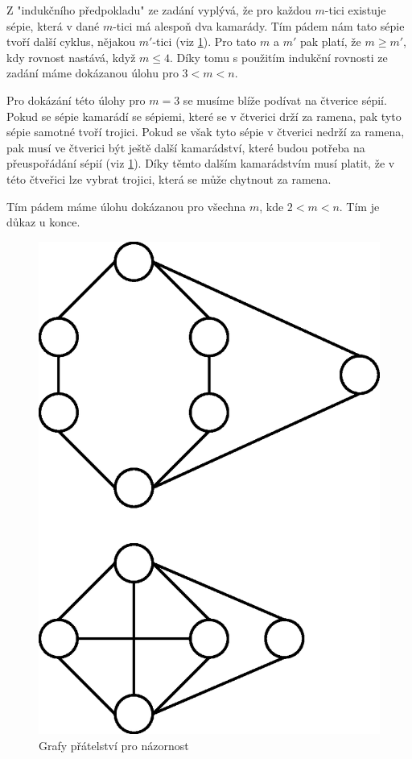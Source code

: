 \documentclass{fkssolpub}
\author{Ondřej Sedláček}
\begin{document}
Z "indukčního předpokladu" ze zadání vyplývá, že pro každou $m$-tici existuje
sépie, která v dané $m$-tici má alespoň dva kamarády. Tím pádem nám tato sépie
tvoří další cyklus, nějakou $m'$-tici (viz \ref{fig:graphs}). Pro tato $m$ a $m'$ pak platí, že
$m \geq m'$, kdy rovnost nastává, když $m \leq 4$. Díky tomu s použitím
indukční rovnosti ze zadání máme dokázanou úlohu pro $3 < m < n$.

Pro dokázání této úlohy pro $m = 3$ se musíme blíže podívat na čtverice sépií.
Pokud se sépie kamarádí se sépiemi, které se v čtverici drží za ramena, pak
tyto sépie samotné tvoří trojici. Pokud se však tyto sépie v čtverici nedrží
za ramena, pak musí ve čtverici být ještě další kamarádství, které budou
potřeba na přeuspořádání sépií (viz \ref{fig:graphs}). Díky těmto dalším
kamarádstvím musí platit, že v této čtveřici lze vybrat trojici, která
se může chytnout za ramena.

Tím pádem máme úlohu dokázanou pro všechna $m$, kde $2 < m < n$. Tím je
důkaz u konce.

\begin{figure}[h!]
	\centering
	\includegraphics{6.eps}
	\caption{Grafy přátelství pro názornost}
	\label{fig:graphs}
\end{figure}
\end{document}
